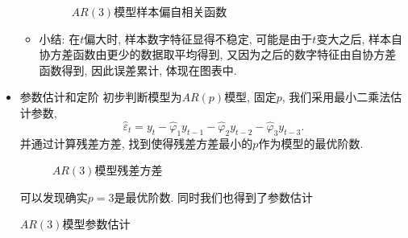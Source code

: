 \documentclass[chinese, lineno, watermark]{assignment}
\begin{document}
\begin{solution}
\begin{itemize}
\begin{itemize}
\begin{figure}[H]
                    \caption{$AR(3)$模型样本偏自相关函数}
                \end{figure}
                \item 小结: 在$t$偏大时, 样本数字特征显得不稳定, 可能是由于$t$变大之后, 样本自协方差函数由更少的数据取平均得到, 又因为之后的数字特征由自协方差函数得到, 因此误差累计, 体现在图表中.
            \end{itemize}
            \item{参数估计和定阶}
            初步判断模型为$AR(p)$模型, 固定$p$, 我们采用最小二乘法估计参数,
            \begin{equation}
                \hat{\varepsilon}_{t} = y_{t}-\hat{\varphi}_{1}y_{t-1}-\hat{\varphi}_{2}y_{t-2}-\hat{\varphi}_{3}y_{t-3}.
            \end{equation}
            并通过计算残差方差, 找到使得残差方差最小的$p$作为模型的最优阶数.
            \begin{figure}[H]
                \centering
                \caption{$AR(3)$模型残差方差}
            \end{figure}
            可以发现确实$p=3$是最优阶数.
            同时我们也得到了参数估计
            \begin{table}[H]
                \begin{center}
                    \caption{$AR(3)$模型参数估计}
                \end{center}

\end{table}
\end{itemize}
\end{solution}
\end{document}
